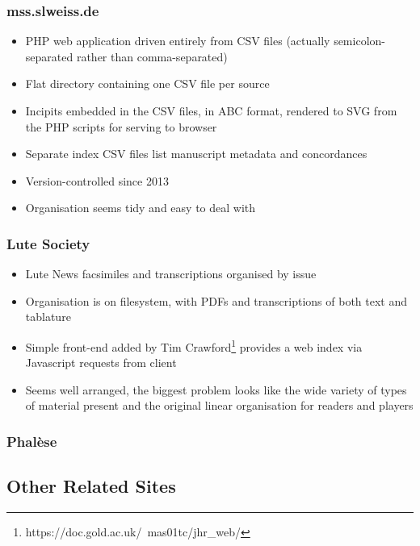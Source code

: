 \documentclass[9pt,twocolumn]{extarticle}
\begin{document}
\begin{sloppypar}
  \subsubsection{mss.slweiss.de}

  \begin{itemize}
  \item PHP web application driven entirely from CSV files (actually
    semicolon-separated rather than comma-separated)
  \item Flat directory containing one CSV file per source
  \item Incipits embedded in the CSV files, in ABC format, rendered to
    SVG from the PHP scripts for serving to browser
  \item Separate index CSV files list manuscript metadata and
    concordances
  \item Version-controlled since 2013
  \item Organisation seems tidy and easy to deal with
  \end{itemize}
    
  \subsubsection{Lute Society}

  \begin{itemize}
  \item Lute News facsimiles and transcriptions organised by issue
  \item Organisation is on filesystem, with PDFs and transcriptions of
    both text and tablature
  \item Simple front-end added by Tim
    Crawford\footnote{https://doc.gold.ac.uk/~mas01tc/jhr\_web/}
    provides a web index via Javascript requests from client
  \item Seems well arranged, the biggest problem looks like the wide
    variety of types of material present and the original linear
    organisation for readers and players
  \end{itemize}
  
  \subsubsection{Phal\`ese}

  \subsection{Other Related Sites}
  

\end{sloppypar}
\end{document}
